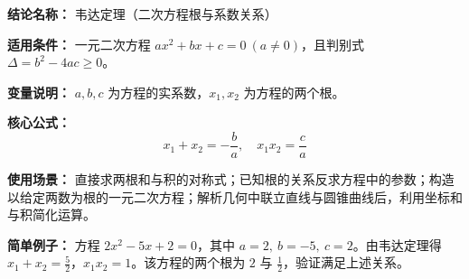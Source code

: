 \textbf{结论名称：} 韦达定理（二次方程根与系数关系）

\textbf{适用条件：} 一元二次方程 \( ax^2+bx+c=0\ (a\neq 0) \)，且判别式 \(\Delta=b^2-4ac\ge 0\)。

\textbf{变量说明：} \(a,b,c\) 为方程的实系数，\(x_1,x_2\) 为方程的两个根。

\textbf{核心公式：}
\[
\boxed{x_1 + x_2 = -\frac{b}{a},\quad x_1 x_2 = \frac{c}{a}}
\]

\textbf{使用场景：} 直接求两根和与积的对称式；已知根的关系反求方程中的参数；构造以给定两数为根的一元二次方程；解析几何中联立直线与圆锥曲线后，利用坐标和与积简化运算。

\textbf{简单例子：} 方程 \( 2x^2 - 5x + 2 = 0 \)，其中 \(a=2,\ b=-5,\ c=2\)。由韦达定理得 \( x_1+x_2 = \frac{5}{2} \)，\( x_1x_2 = 1 \)。该方程的两个根为 \(2\) 与 \(\frac{1}{2}\)，验证满足上述关系。